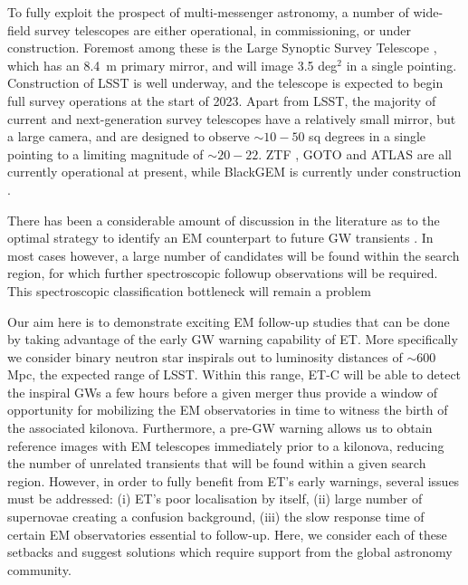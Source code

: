 \documentclass{aa}
\begin{document}
To fully exploit the prospect of multi-messenger astronomy, a number of wide-field survey telescopes are either operational, in commissioning, or under construction. Foremost among these is the Large Synoptic Survey Telescope \citep[LSST;][]{LSSTbook}, which has an 8.4~m primary mirror, and will image 3.5 deg$^2$ in a single pointing. Construction of LSST is well underway, and the telescope is expected to begin full survey operations at the start of 2023. Apart from LSST, the majority of current and next-generation survey telescopes have a relatively small mirror, but a large camera, and are designed to observe $\sim10 - 50$ sq degrees in a single pointing to a limiting magnitude of $\sim20-22$. ZTF \citep{ZTF}, GOTO \citep{GOTO} and ATLAS \citep{ATLAS} are all currently operational at present, while BlackGEM is currently under construction \citep{BlackGEM}.

There has been a considerable amount of discussion in the literature as to the optimal strategy to identify an EM counterpart to future GW transients \citep{2016ApJ...820..136G, 2011MNRAS.415L..26C, 2016A&A...592A..82G, 2017ApJ...834...84C, 2014MNRAS.437..649S, 2016MNRAS.462.1085A}. In most cases however, a large number of candidates will be found within the search region, for which further spectroscopic followup observations will be required. This spectroscopic classification bottleneck will remain a problem


Our aim here is to demonstrate exciting EM follow-up studies that can be done by taking advantage of the early GW warning capability of ET. More specifically we
consider binary neutron star inspirals
out to luminosity distances of $\sim 600\,$Mpc, 
the expected range of LSST. Within this range,
ET-C will be able to detect the inspiral GWs
a few hours before a given merger thus provide
a window of opportunity for mobilizing the EM
observatories in time to witness the birth of 
the associated kilonova. Furthermore, a pre-GW warning allows us to 
obtain reference images with EM telescopes immediately prior to a kilonova, reducing the number
of unrelated transients that will be found within a given search region.
However, in order to
fully benefit from ET's early warnings, several
issues must be addressed: (i) ET's poor localisation by itself, (ii) large number of 
supernovae creating a confusion background, 
(iii) the slow response time of certain EM 
observatories essential to follow-up. %
Here, we consider each of these setbacks and
suggest solutions which require support from the global astronomy community.
\end{document}
